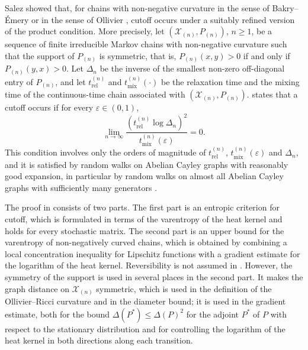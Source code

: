 \documentclass[a4paper, reqno, 11pt]{amsart}
\theoremstyle{definition}
\begin{document}
Salez \cite{Salez2024} showed that, for chains with non-negative curvature in the sense of Bakry--\'Emery \cite{BE1985} or in the sense of Ollivier \cite{Ollivier2009}, cutoff occurs under a suitably refined version of the product condition.
More precisely, let $(\mathcal{X}_{(n)}, P_{(n)})$, $n \ge 1$, be a sequence of finite irreducible Markov chains with non-negative curvature such that the support of $P_{(n)}$ is symmetric, that is, $P_{(n)}(x,y) > 0$ if and only if $P_{(n)}(y,x) > 0$.
Let $\Delta_n$ be the inverse of the smallest non-zero off-diagonal entry of $P_{(n)}$,
and let $t_{\mathrm{rel}}^{(n)}$ and $t_{\mathrm{mix}}^{(n)}(\cdot)$ be the relaxation time and the mixing time of the continuous-time chain associated with $(\mathcal{X}_{(n)}, P_{(n)})$. 
\cite[Theorem 1]{Salez2024} states that a cutoff occurs if for every $\varepsilon \in (0,1)$,
\[ \lim_{n \to \infty} \frac{\left(t_{\mathrm{rel}}^{(n)} \log \Delta_n\right)^{2}}{t_{\mathrm{mix}}^{(n)}(\varepsilon)} = 0. \]
This condition involves only the orders of magnitude of $t_{\mathrm{rel}}^{(n)}$, $t_{\mathrm{mix}}^{(n)}(\varepsilon)$ and $\Delta_n$,
and it is satisfied by random walks on Abelian Cayley graphs with reasonably good expansion, in particular by random walks on almost all Abelian Cayley graphs with sufficiently many generators \cite[Corollaries 3 and 4]{Salez2024}.

The proof in \cite{Salez2024} consists of two parts.
The first part is an entropic criterion for cutoff, which is formulated in terms of the varentropy of the heat kernel and holds for every stochastic matrix.
The second part is an upper bound for the varentropy of non-negatively curved chains, which is obtained by combining a local concentration inequality for Lipschitz functions with a gradient estimate for the logarithm of the heat kernel.
Reversibility is not assumed in \cite{Salez2024}.
However, the symmetry of the support is used in several places in the second part. 
It makes the graph distance on $\mathcal{X}_{(n)}$ symmetric, which is used in the definition of the Ollivier--Ricci curvature and in the diameter bound;
it is used in the gradient estimate, both for the bound $\Delta(P^{*}) \le \Delta(P)^{2}$ for the adjoint $P^{*}$ of $P$ with respect to the stationary distribution and for controlling the logarithm of the heat kernel in both directions along each transition. 
\end{document}
